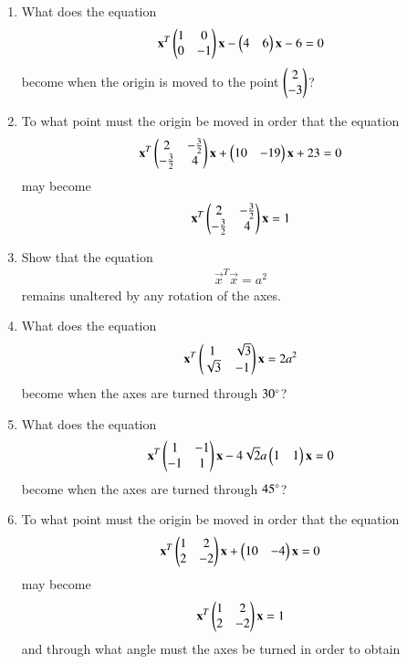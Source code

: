\renewcommand{\theequation}{\theenumi}
\begin{enumerate}[label=\arabic*.,ref=\thesubsection.\theenumi]
\item What does the equation 
\begin{align}
\mathbf{x}^T\begin{pmatrix}1 & 0\\0 & -1\end{pmatrix}\mathbf{x}-\begin{pmatrix}4 & 6\end{pmatrix}\mathbf{x}-6=0
\end{align}
become when the origin is moved to the point $\begin{pmatrix}2\\-3\end{pmatrix}$?
\item To what point must the origin be moved in order that the equation
\begin{align}
\mathbf{x}^T\begin{pmatrix}2 & -\frac{3}{2}\\ -\frac{3}{2} & 4\end{pmatrix}\mathbf{x}+\begin{pmatrix}10 & -19\end{pmatrix}\mathbf{x}+23=0
\end{align}
may become
\begin{align}
\mathbf{x}^T\begin{pmatrix}2 & -\frac{3}{2}\\ -\frac{3}{2} & 4\end{pmatrix}\mathbf{x} = 1
\end{align}
\item Show that the equation
\begin{align}
\vec{x}^T\vec{x}= a^2
\end{align}
remains unaltered by any rotation of the axes.
\item What does the equation
\begin{align}
\mathbf{x}^T\begin{pmatrix}1 & \sqrt{3}\\ \sqrt{3} & -1\end{pmatrix}\mathbf{x} = 2a^2
\end{align}
become when the axes are turned through $30\degree$?
\item What does the equation
\begin{align}
\mathbf{x}^T\begin{pmatrix}1 & -1\\-1 & 1\end{pmatrix}\mathbf{x}-4\sqrt{2}a\begin{pmatrix}1 & 1\end{pmatrix}\mathbf{x}=0
\end{align}
become when the axes are turned through $45\degree$?
\item To what point must the origin be moved in order that the equation
\begin{align}
\mathbf{x}^T\begin{pmatrix}1 & 2\\2 & -2\end{pmatrix}\mathbf{x}+\begin{pmatrix}10 & -4\end{pmatrix}\mathbf{x}=0
\end{align}
may become
\begin{align}
\mathbf{x}^T\begin{pmatrix}1 & 2\\2 & -2\end{pmatrix}\mathbf{x}= 1
\end{align}
and through what angle must the axes be turned in order to obtain
\begin{align}

\end{align}
\end{enumerate}
